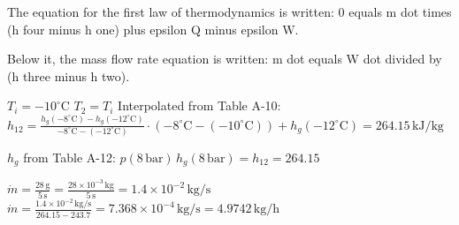 The equation for the first law of thermodynamics is written:  
0 equals m dot times (h four minus h one) plus epsilon Q minus epsilon W.  

Below it, the mass flow rate equation is written:  
m dot equals W dot divided by (h three minus h two).

\( T_i = -10^\circ \text{C} \)  
\( T_2 = T_i \)  
Interpolated from Table A-10:  
\( h_{12} = \frac{h_g(-8^\circ \text{C}) - h_g(-12^\circ \text{C})}{-8^\circ \text{C} - (-12^\circ \text{C})} \cdot (-8^\circ \text{C} - (-10^\circ \text{C})) + h_g(-12^\circ \text{C}) = 264.15 \, \text{kJ/kg} \)  

\( h_g \) from Table A-12:  
\( p(8 \, \text{bar}) \, h_g(8 \, \text{bar}) = h_{12} = 264.15 \)  

\( \dot{m} = \frac{28 \, \text{g}}{5 \, \text{s}} = \frac{28 \times 10^{-3} \, \text{kg}}{5 \, \text{s}} = 1.4 \times 10^{-2} \, \text{kg/s} \)  
\( \dot{m} = \frac{1.4 \times 10^{-2} \, \text{kg/s}}{264.15 - 243.7} = 7.368 \times 10^{-4} \, \text{kg/s} = 4.9742 \, \text{kg/h} \)